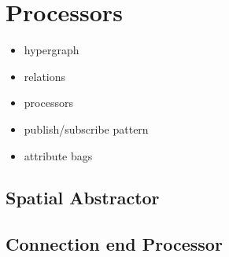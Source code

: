 \section{Processors}




\begin{itemize}
  \item hypergraph
  \item relations
  \item processors
  \item publish/subscribe pattern
  \item attribute bags
\end{itemize}

\subsection{Spatial Abstractor}

\subsection{Connection end Processor}